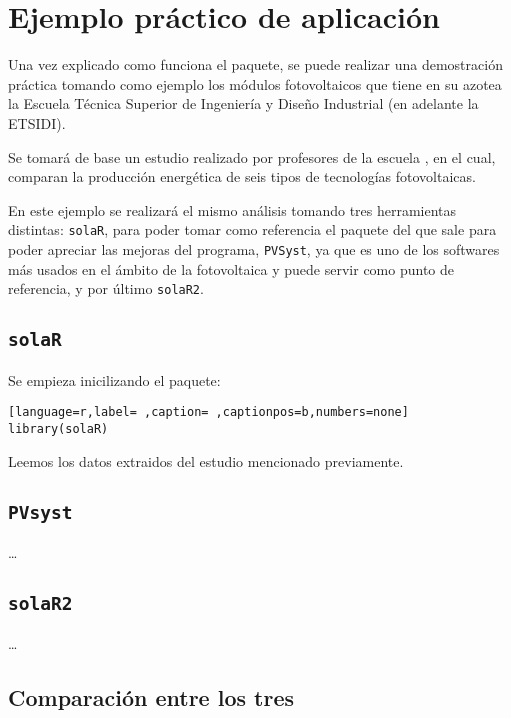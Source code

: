 \chapter{Ejemplo práctico de aplicación}
\label{chap:ejemplo-practico-aplicacion}
Una vez explicado como funciona el paquete, se puede realizar una demostración práctica tomando como ejemplo los módulos fotovoltaicos que tiene en su azotea la Escuela Técnica Superior de Ingeniería y Diseño Industrial (en adelante la ETSIDI).

Se tomará de base un estudio realizado por profesores de la escuela \cite{adrada17}, en el cual, comparan la producción energética de seis tipos de tecnologías fotovoltaicas.

En este ejemplo se realizará el mismo análisis tomando tres herramientas distintas: \texttt{solaR}, para poder tomar como referencia el paquete del que sale para poder apreciar las mejoras del programa, \texttt{PVSyst}, ya que es uno de los softwares más usados en el ámbito de la fotovoltaica y puede servir como punto de referencia, y por último \texttt{solaR2}.

\section{\texttt{solaR}}
\label{sec:orgd052418}
Se empieza inicilizando el paquete:
\begin{lstlisting}[language=r,label= ,caption= ,captionpos=b,numbers=none]
library(solaR)
\end{lstlisting}

Leemos los datos extraidos del estudio mencionado previamente. 

\section{\texttt{PVsyst}}
\label{sec:orgda15b80}

\ldots{}


\section{\texttt{solaR2}}
\label{sec:org40adc72}

\ldots{}

\section{Comparación entre los tres}
\label{sec:orgaac1a84}
